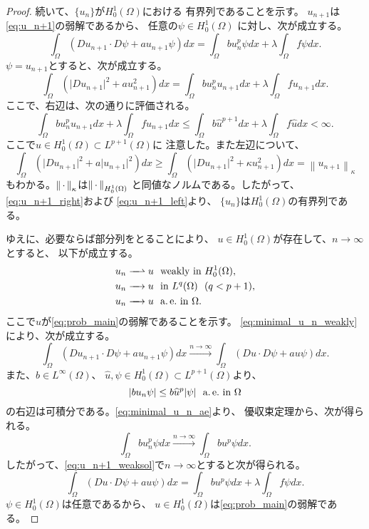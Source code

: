 \begin{proof}
 続いて、$\{u_n\}$が$H_0^1(\Omega)$における
 有界列であることを示す。
 $u_{n+1}$は\eqref{eq:u_n+1}の弱解であるから、
 任意の$\psi \in H_0^1(\Omega)$
 に対し、次が成立する。
 \begin{equation}
  \int_\Omega (Du_{n+1} \cdot D\psi + a u_{n+1} \psi) dx 
   = \int_\Omega bu_n^p \psi dx + \lambda \int_\Omega f\psi dx.
   \label{eq:u_n+1_weaksol}
 \end{equation}
 $\psi = u_{n+1}$とすると、次が成立する。
 \[
 \int_\Omega (\lvert Du_{n+1} \rvert^2 
 + a u_{n+1} ^2) dx 
 = \int_\Omega bu_n^p u_{n+1} dx 
 + \lambda \int_\Omega f u_{n+1} dx.
 \]
 ここで、右辺は、次の通りに評価される。
 \begin{equation}
  \int_\Omega bu_n^p u_{n+1} dx 
   + \lambda \int_\Omega f u_{n+1} dx
 \leq \int_\Omega b\hat{u}^{p+1} dx + \lambda
   \int_\Omega f \hat{u} dx < \infty. \label{eq:u_n+1_right}
 \end{equation}
 ここで$\hat{u} \in H_0^1(\Omega) \subset L^{p+1}(\Omega)$に
 注意した。また左辺について、
 \begin{equation}
  \int_\Omega (\lvert Du_{n+1} \rvert^2 
   + a \lvert u_{n+1} \rvert^2) dx 
 \geq \int_\Omega \left( \lvert Du_{n+1} \rvert^2 + \kappa
         u_{n+1} ^2 \right) dx = \left\| u_{n+1} 
                                                \right\|_{\kappa}
  \label{eq:u_n+1_left}
 \end{equation}
 もわかる。$\left\|\, \cdot \, \right\|_\kappa$は$\left\|\, \cdot \, \right\|_{H_0^1(\Omega)}$
 と同値なノルムである。したがって、\eqref{eq:u_n+1_right}および
 \eqref{eq:u_n+1_left}より、
 $\{u_n\}$は$H_0^1(\Omega)$の有界列である。

 ゆえに、必要ならば部分列をとることにより、
 $u \in H_0^1(\Omega)$が存在して、$n \to \infty$とすると、
 以下が成立する。
 \begin{align}
  u_n \xrightharpoonup{ \mbox{ ~ } } u & \ \ \text{weakly~} \tin
  H_0^1(\Omega), \label{eq:minimal_u_n_weakly} \\
  u_n \xrightarrow{ \mbox{ ~ } } u & \ \ \tin L^q(\Omega) \notag \ \
   (q < p+1), \\
  u_n \xrightarrow{ \mbox{ ~ } } u & \ \ \ae \tin \Omega. 
    \label{eq:minimal_u_n_ae}
 \end{align}
 ここで$u$が\ref{eq:prob_main}の弱解であることを示す。
 \eqref{eq:minimal_u_n_weakly}により、次が成立する。
 \[
 \int_\Omega (Du_{n+1} \cdot D\psi + a u_{n+1} \psi) dx
 \xrightarrow{n \to \infty}
 \int_\Omega (Du \cdot D\psi + a u \psi) dx.
 \]
 また、$b \in L^\infty(\Omega)$、
 $\hat{u}, \psi \in H_0^1(\Omega) \subset L^{p+1}(\Omega)$より、
 \[
  \left\lvert bu_n \psi \right\rvert \leq b \widehat{u}^p \lvert\psi\rvert \ \ \text{a.\,e.}~
 \text{in}~ \Omega
 \]
 の右辺は可積分である。\eqref{eq:minimal_u_n_ae}より、
 優収束定理から、次が得られる。
 \[
 \int_\Omega bu_n^p \psi dx \xrightarrow{n \to \infty} 
 \int_\Omega bu^p \psi dx.
 \]
 したがって、\eqref{eq:u_n+1_weaksol}で$n \to \infty$とすると次が得られる。
 \begin{equation}
  \int_\Omega (Du \cdot D\psi + a u \psi) dx 
   = \int_\Omega bu^p \psi dx + \lambda \int_\Omega f\psi dx.
   \label{eq:minimal_u_weaksol}
 \end{equation}
 $\psi \in H_0^1(\Omega)$は任意であるから、
 $u \in H_0^1(\Omega)$は\ref{eq:prob_main}の弱解である。
 

\end{proof}
